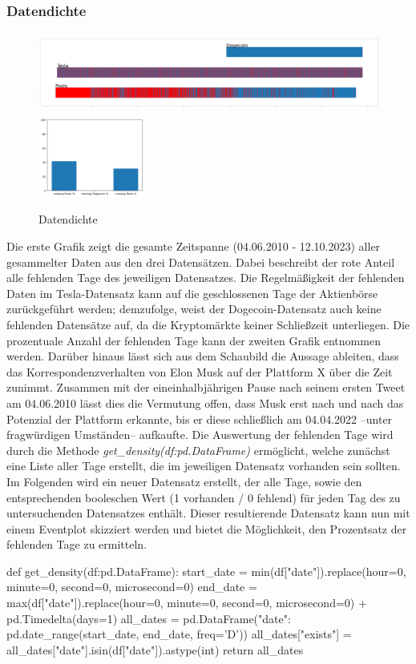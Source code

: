 \documentclass{article}
\begin{document}
\subsubsection{Datendichte}
\begin{figure}[!htb]
  	\includegraphics[width=.7\textwidth, height=100px]{./imgs/Dichte1.png}
	\includegraphics[width=.3\textwidth, height=100px]{./imgs/Dichte2.png}
 	\caption{Datendichte}
 	\label{fig:Datendichte}
\end{figure}
Die erste Grafik zeigt die gesamte Zeitspanne (04.06.2010 - 12.10.2023) aller gesammelter Daten aus den drei Datensätzen.
Dabei beschreibt der rote Anteil alle fehlenden Tage des jeweiligen Datensatzes.
Die Regelmäßigkeit der fehlenden Daten im Tesla-Datensatz kann auf die geschlossenen Tage der Aktienbörse zurückgeführt werden;
demzufolge, weist der Dogecoin-Datensatz auch keine fehlenden Datensätze auf, da die Kryptomärkte keiner Schließzeit unterliegen.
Die prozentuale Anzahl der fehlenden Tage kann der zweiten Grafik entnommen werden.
Darüber hinaus lässt sich aus dem Schaubild die Aussage ableiten, dass das Korrespondenzverhalten von Elon Musk auf der Plattform X über die Zeit zunimmt.
Zusammen mit der eineinhalbjährigen Pause nach seinem ersten Tweet am 04.06.2010 lässt dies die Vermutung offen, dass Musk erst nach und nach das Potenzial der Plattform erkannte, bis er diese schließlich am 04.04.2022 --unter fragwürdigen Umständen-- aufkaufte. 
Die Auswertung der fehlenden Tage wird durch die Methode \textit{get\_density(df:pd.DataFrame)} ermöglicht, welche zunächst eine Liste aller Tage erstellt, die im jeweiligen Datensatz vorhanden sein sollten.
Im Folgenden wird ein neuer Datensatz erstellt, der alle Tage, sowie den entsprechenden booleschen Wert (1 vorhanden / 0 fehlend) für jeden Tag des zu untersuchenden Datensatzes enthält.
Dieser resultierende Datensatz kann nun mit einem Eventplot skizziert werden und bietet die Möglichkeit, den Prozentsatz der fehlenden Tage zu ermitteln.
\begin{python}
def get_density(df:pd.DataFrame):
    start_date = min(df["date"]).replace(hour=0, minute=0, second=0, microsecond=0)
    end_date = max(df["date"]).replace(hour=0, minute=0, second=0, microsecond=0) + pd.Timedelta(days=1)
    all_dates = pd.DataFrame({"date": pd.date_range(start_date, end_date, freq='D')})
    all_dates["exists"] = all_dates["date"].isin(df["date"]).astype(int)
    return all_dates
\end{python}
\end{document}

